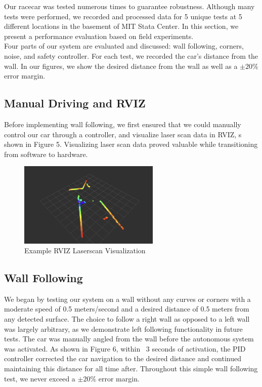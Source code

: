 \documentclass{article}
\begin{document}
Our racecar was tested numerous times to guarantee robustness. Although many tests were performed, we recorded and processed data for 5 unique tests at 5 different locations in the basement of MIT Stata Center. In this section, we present a performance evaluation based on field experiments.\\

Four parts of our system are evaluated and discussed: wall following, corners, noise, and safety controller. For each test, we recorded the car's distance from the wall. In our figures, we show the desired distance from the wall as well as a $\pm 20\%$ error margin. \\

\subsection{Manual Driving and RVIZ}
Before implementing wall following, we first ensured that we could manually control our car through a controller, and visualize laser scan data in RVIZ, s shown in Figure 5. Visualizing laser scan data proved valuable while transitioning from software to hardware. 

\begin{figure}[H]
\begin{center}
\includegraphics[width=0.6\textwidth]{rviz scn.jpg} %
\caption{Example RVIZ Laserscan Visualization}
\end{center}
\label{workflow}
\end{figure}

\subsection{Wall Following}
We began by testing our system on a wall without any curves or corners with a moderate speed of 0.5 meters/second and a desired distance of 0.5 meters from any detected surface. The choice to follow a right wall as opposed to a left wall was largely arbitrary, as we demonstrate left following functionality in future tests. The car was manually angled from the wall before the autonomous system was activated. As shown in Figure 6, within ~3 seconds of activation, the PID controller corrected the car navigation to the desired distance and continued maintaining this distance for all time after. Throughout this simple wall following test, we never exceed a $\pm 20\%$ error margin.\\
\end{document}
